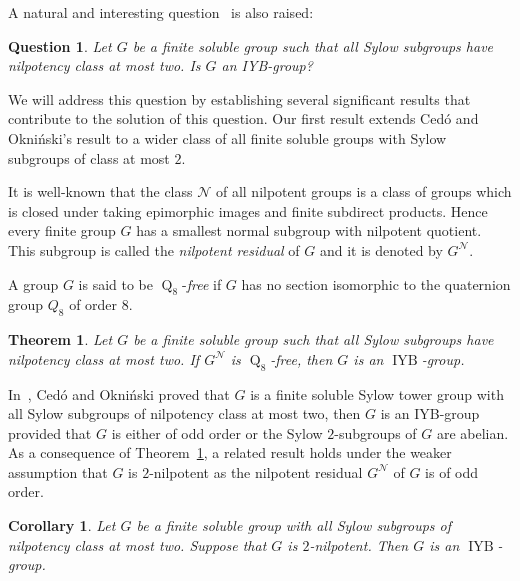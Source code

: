 \documentclass[12pt,a4paper]{article}
\DeclareMathOperator{\Q}{Q}
\DeclareMathOperator{\IYB}{IYB}
\newtheorem{corollary}[theorem]{Corollary}
\newtheorem{question}[theorem]{Question}
\newtheorem{athm}{Theorem}
\theoremstyle{definition}
\begin{document}
A natural and interesting question~\cite[Question~2.7]{CedoOkninski2025} is also raised:
\begin{question}
Let $G$ be a finite soluble group such that all Sylow subgroups have nilpotency class at most two. Is $G$ an IYB-group?
\end{question}

We will address this question by establishing several significant results that contribute to the solution of this question. Our first result extends Ced\'{o} and Okni\'{n}ski's result to a wider class of all finite soluble groups with Sylow subgroups of class at most $2$.

It is well-known that the class $\mathcal{N}$ of all nilpotent groups is a class of groups which is closed under taking epimorphic images and finite subdirect products. Hence every finite group $G$ has a smallest normal subgroup with nilpotent quotient. This subgroup is called  the \emph{nilpotent residual} of $G$ and it is denoted by $G^{\mathcal{N}}$.


A group $G$ is said to be $\Q_8$-\emph{free} if $G$ has no section isomorphic to the quaternion group $Q_8$ of order $8$.



\begin{athm}\label{thm-Q-8}
Let $G$ be a finite soluble group such that all Sylow subgroups have nilpotency class at most two. If  $G^{\mathcal{N}}$ is $\Q_8$-free, then $G$ is an $\IYB$-group.
\end{athm}


In~\cite[Theorem~2.3]{CedoOkninski2025},  Ced\'{o} and Okni\'{n}ski proved that $G$ is a finite soluble Sylow tower group with all Sylow subgroups of nilpotency class at most two, then $G$ is an IYB-group provided that $G$ is either of odd order or the Sylow $2$-subgroups of $G$ are abelian. As a consequence of Theorem~\ref{thm-Q-8}, a related result holds under the weaker assumption that $G$ is $2$-nilpotent as the nilpotent residual $G^{\mathcal{N}}$ of $G$ is of odd order.


\begin{corollary}
Let $G$ be a finite soluble group with all Sylow subgroups of nilpotency class at most two. Suppose that $G$ is $2$-nilpotent. Then $G$ is an $\IYB$-group.
\end{corollary}
\end{document}
